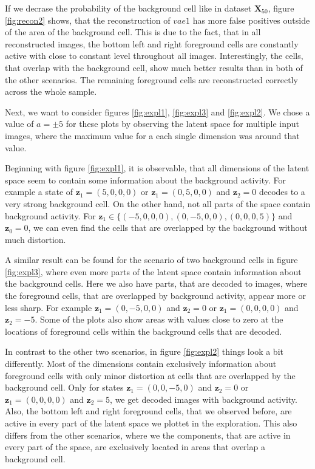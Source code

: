 \documentclass[12pt]{report}
\theoremstyle{definition}
\begin{document}
If we decrase the probability of the background cell like in dataset $\mathbf{X}_{50}$, figure \ref{fig:recon2} shows, that the reconstruction of $vae1$ has more false positives outside of the area of the background cell. This is due to the fact, that in all reconstructed images, the bottom left and right foreground cells are constantly active with close to constant level throughout all images. Interestingly, the cells, that overlap with the background cell, show much better results than in both of the other scenarios. The remaining foreground cells are reconstructed correctly across the whole sample.

Next, we want to consider figures \ref{fig:expl1}, \ref{fig:expl3} and \ref{fig:expl2}. We chose a value of $a = \pm 5$ for these plots by observing the latent space for multiple input images, where the maximum value for a each single dimension was around that value.

Beginning with figure \ref{fig:expl1}, it is observable, that all dimensions of the latent space seem to contain some information about the background activity. For example a state of $\mathbf{z}_1 = (5, 0, 0, 0)$ or $\mathbf{z}_1 = (0, 5, 0, 0)$ and $\mathbf{z}_2 = 0$ decodes to a very strong background cell. On the other hand, not all parts of the space contain background activity. For $\mathbf{z}_1 \in \{(-5, 0, 0, 0), (0, -5, 0, 0), (0, 0, 0, 5)\}$ and $\mathbf{z}_0 = 0$, we can even find the cells that are overlapped by the background without much distortion.

A similar result can be found for the scenario of two background cells in figure \ref{fig:expl3}, where even more parts of the latent space contain information about the background cells. Here we also have parts, that are decoded to images, where the foreground cells, that are overlapped by background activity, appear more or less sharp. For example $\mathbf{z}_1 = (0, -5, 0, 0)$ and $\mathbf{z}_2=0$ or $\mathbf{z}_1 = (0, 0, 0, 0)$ and $\mathbf{z}_2 = -5$. Some of the plots also show areas with values close to zero at the locations of foreground cells within the background cells that are decoded.

In contrast to the other two scenarios, in figure \ref{fig:expl2} things look a bit differently. Most of the dimensions contain exclusively information about foreground cells with only minor distortion at cells that are overlapped by the background cell. Only for states $\mathbf{z}_1 = (0, 0, -5, 0)$ and $\mathbf{z}_2=0$ or $\mathbf{z}_1 = (0, 0, 0, 0)$ and $\mathbf{z}_2 = 5$, we get decoded images with background activity. Also, the bottom left and right foreground cells, that we observed before, are active in every part of the latent space we plottet in the exploration. This also differs from the other scenarios, where we the components, that are active in every part of the space, are exclusively located in areas that overlap a background cell.
\end{document}
